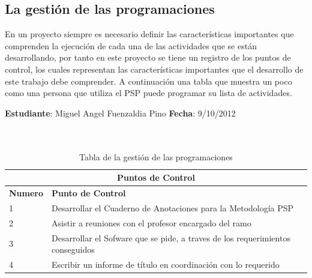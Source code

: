 \documentclass[a4paper,12pt,openany,oneside]{book}
\begin{document}
\subsection{La gestión de las programaciones}
En un proyecto siempre es necesario definir las características importantes que comprenden la ejecución de cada una de las actividades que se están desarrollando, por tanto en este proyecto se tiene un registro de los puntos de control, los cuales representan las características importantes que el desarrollo de este trabajo debe comprender. A continuación una tabla que muestra un poco como una persona que utiliza el PSP puede programar su lista de actividades.
\begin{table}
\textbf{Estudiante}: Miguel Angel Fuenzaldia Pino     \textbf{Fecha}: 9/10/2012\\\\\
\begin{tabular}{| l | l |}
\hline
\multicolumn{2}{|c|}{\textbf{Puntos de Control}}\\
\hline
\textbf{Numero} & \textbf{Punto de Control}\\
\hline
1 & Desarrollar el Cuaderno de Anotaciones para la Metodología PSP \\
\hline
2 & Asistir a reuniones con el profesor encargado del ramo \\
\hline
3 & Desarrollar el Sofware que se pide, a traves de los requerimientos conseguidos \\
\hline
4 & Escribir un informe de título en coordinación con lo requerido\\
\hline
\end{tabular}
\caption{Tabla de la gestión de las programaciones}
\end{table}
\end{document}
